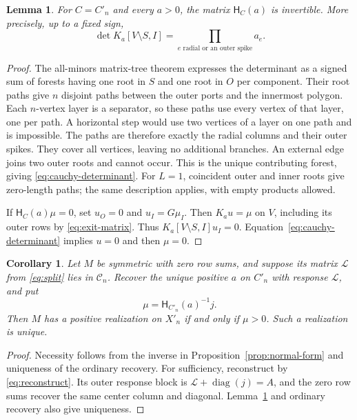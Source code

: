 \documentclass[11pt]{article}
\newtheorem{lemma}[theorem]{Lemma}
\newtheorem{corollary}[theorem]{Corollary}
\theoremstyle{definition}
\newcommand{\diag}{\operatorname{diag}}
\newcommand{\exitmat}{\mathsf H}
\newcommand{\cell}{\mathcal C}
\begin{document}
\begin{lemma}
\label{lem:exit-invertible}
For $C=C'_n$ and every $a>0$, the matrix $\exitmat_C(a)$ is
invertible. More precisely, up to a fixed sign,
\begin{equation}
 \det K_a[V\setminus S,I]
 =\prod_{e\text{ radial or an outer spike}}a_e.
 \label{eq:cauchy-determinant}
\end{equation}
\end{lemma}
\begin{proof}
The all-minors matrix-tree theorem \cite{Chaiken} expresses the
determinant as a signed sum of forests having one root in $S$ and
one root in $O$ per component. Their root paths give $n$ disjoint
paths between the outer ports and the innermost polygon. Each
$n$-vertex layer is a separator, so these paths use every vertex of
that layer, one per path. A horizontal step would use two vertices
of a layer on one path and is impossible. The paths are therefore
exactly the radial columns and their outer spikes. They cover all
vertices, leaving no additional branches. An external edge joins
two outer roots and cannot occur. This is the unique contributing
forest, giving \eqref{eq:cauchy-determinant}. For $L=1$, coincident
outer and inner roots give zero-length paths; the same description
applies, with empty products allowed.

If $\exitmat_C(a)\mu=0$, set $u_O=0$ and $u_I=G\mu_I$.
Then $K_au=\mu$ on $V$, including its outer rows by
\eqref{eq:exit-matrix}. Thus
$K_a[V\setminus S,I]u_I=0$. Equation~\eqref{eq:cauchy-determinant}
implies $u=0$ and then $\mu=0$.
\end{proof}

\begin{corollary}
\label{cor:source-test}
Let $M$ be symmetric with zero row sums, and suppose its matrix
$\mathcal L$ from \eqref{eq:split} lies in $\cell_n$.
Recover the unique positive $a$ on $C'_n$ with response
$\mathcal L$, and put
\begin{equation}
 \mu=\exitmat_{C'_n}(a)^{-1}j.
 \label{eq:mu-test}
\end{equation}
Then $M$ has a positive realization on $X'_n$ if and only if
$\mu>0$. Such a realization is unique.
\end{corollary}
\begin{proof}
Necessity follows from the inverse in
Proposition~\ref{prop:normal-form} and uniqueness of the ordinary
recovery. For sufficiency, reconstruct by \eqref{eq:reconstruct}.
Its outer response block is $\mathcal L+\diag(j)=A$, and the
zero row sums recover the same center column and diagonal.
Lemma~\ref{lem:exit-invertible} and ordinary recovery also give
uniqueness.
\end{proof}
\end{document}
